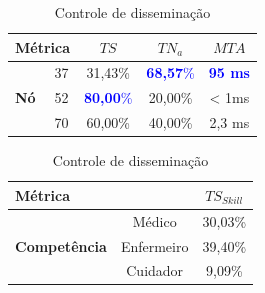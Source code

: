 \documentclass[12pt]{article}
\begin{document}
\begin{table}[!htb]
	\begin{minipage}[t]{0.5\linewidth}
	    \centering
        \caption{Disseminação dos dados}
        \vspace{-0.2cm}
        \label{tab:AcessoCompetencia}
        { \footnotesize
        \begin{tabular}{l|c|ccc}
        \hline%
        \multicolumn{2}{l|}{\textbf{Métrica}} & $TS$ &$TN_a$& $MTA$\\ \hline%
        \multirow{3}{*}{\textbf{Nó}}&37 & 31,43\% &\textcolor{blue}{\textbf{68,57}\%}& \textcolor{blue}{\textbf{95 ms}}\\%
        &52 & \textcolor{blue}{\textbf{80,00}\%} &20,00\% & < 1ms\\%
        &70 & 60,00\% &40,00\% &2,3 ms \\%
        \hline%
        \end{tabular}
        }
	\end{minipage}	
	\begin{minipage}[t]{0.5\linewidth}
	    \centering
        \caption{Controle de disseminação}
        \vspace{-0.2cm}
        \label{tab:taxaMedia}
        { \footnotesize
        \begin{tabular}{l|c|c}
        \hline%
        \multicolumn{2}{l|}{\textbf{Métrica}} & $TS_{Skill}$ \\ \hline%
        \multirow{4}{*}{\textbf{Competência}}&Médico & 30,03\% \\%
        &Enfermeiro & 39,40\% \\%
        &Cuidador & 9,09\% \\%
        \hline%
        \end{tabular}
        }
	\end{minipage}\hfill
\end{table}

\vspace{0.3cm}
\end{document}

